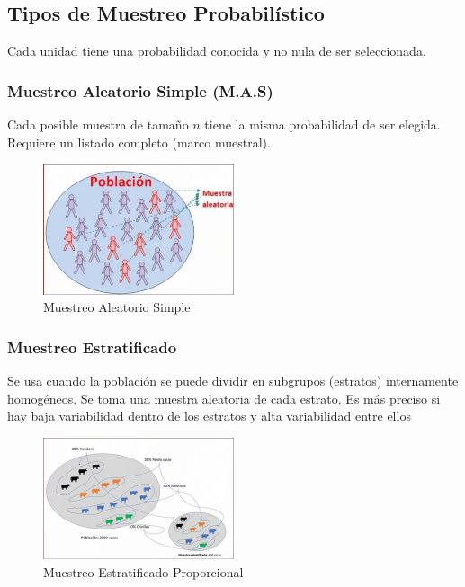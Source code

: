 \documentclass[12pt, letterpaper]{article}
\begin{document}
\subsection{Tipos de Muestreo Probabilístico}
Cada unidad tiene una probabilidad conocida y no nula de ser seleccionada.

\subsubsection{Muestreo Aleatorio Simple (M.A.S)}
Cada posible muestra de tamaño $n$ tiene la misma probabilidad de ser elegida. Requiere un listado completo (marco muestral).
\begin{figure}[htbp]
    \centering
    \includegraphics[width=0.5\textwidth]{MAS}
    \caption{Muestreo Aleatorio Simple}
    \label{fig:MAS}
\end{figure}


\subsubsection{Muestreo Estratificado}
Se usa cuando la población se puede dividir en subgrupos (estratos) internamente homogéneos. Se toma una muestra aleatoria de cada estrato. Es más preciso si hay baja variabilidad dentro de los estratos y alta variabilidad entre ellos

\begin{figure}[htbp]
    \centering
    \includegraphics[width=0.5\textwidth]{MEP}
    \caption{Muestreo Estratificado Proporcional}
    \label{fig:MEP}
\end{figure}
\end{document}
